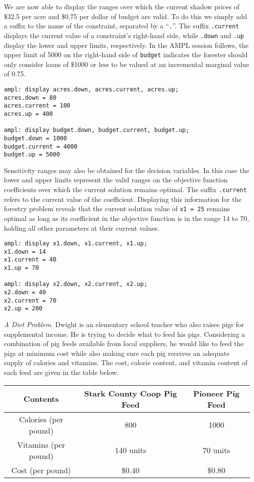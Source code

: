 We are now able to display the ranges over which the current shadow
prices of \$32.5 per acre and \$0.75 per dollar of budget are
valid. To do this we simply add a suffix to the name of the
constraint, separated by a ``\texttt{.}''. The suffix
\texttt{.current} displays the current value of a constraint's
right-hand side, while \texttt{.down} and \texttt{.up} display the
lower and upper limits, respectively. In the AMPL session follows, the
upper limit of 5000 on the right-hand side of \texttt{budget}
indicates the forester should only consider loans of \$1000 or less to
be valued at an incremental marginal value of 0.75.

\begin{Verbatim}[samepage=true]
ampl: display acres.down, acres.current, acres.up;
acres.down = 80
acres.current = 100
acres.up = 400

ampl: display budget.down, budget.current, budget.up;
budget.down = 1000
budget.current = 4000
budget.up = 5000
\end{Verbatim}

Sensitivity ranges may also be obtained for the decision variables. In
this case the lower and upper limits represent the valid ranges on the
objective function coefficients over which the current solution
remains optimal.  The suffix \texttt{.current} refers to the current
value of the coefficient.  Displaying this information for the
forestry problem reveals that the current solution value of \texttt{x1
  = 25} remains optimal as long as its coefficient in the objective
function is in the range 14 to 70, holding all other parameters at
their current values.

\begin{Verbatim}[samepage=true]
ampl: display x1.down, x1.current, x1.up;
x1.down = 14
x1.current = 40
x1.up = 70

ampl: display x2.down, x2.current, x2.up;
x2.down = 40
x2.current = 70
x2.up = 200
\end{Verbatim}

\emph{A Diet Problem.}
Dwight is an elementary school teacher who also raises pigs for
supplemental income. He is trying to decide what to feed his pigs.
Considering a combination of pig feeds available from local suppliers,
he would like to feed the pigs at minimum cost while also making sure
each pig receives an adequate supply of calories and vitamins.  The
cost, calorie content, and vitamin content of each feed are given in
the table below.

\vspace{.1in}
\begin{center}
\begin{tabular}{ccc}
\textbf{Contents}   &  \textbf{Stark County Coop Pig Feed }   & \textbf{Pioneer Pig Feed} \\   \hline
Calories (per pound)  &  800    &  1000   \\
Vitamins (per pound)  &  140 units  &  70 units  \\
Cost (per pound)   &  \$0.40    & \$0.80  \\
\end{tabular}
\end{center}
\vspace{.1in}

